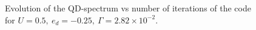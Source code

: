\begin{figure}[h]
\caption{\label{Fig-Dot-Spectrum} Evolution of the QD-spectrum vs number of
iterations of the code for $U=0.5,\ e_{d}=-0.25,\ \Gamma=2.82\times10^{-2}.$ }
\end{figure}


